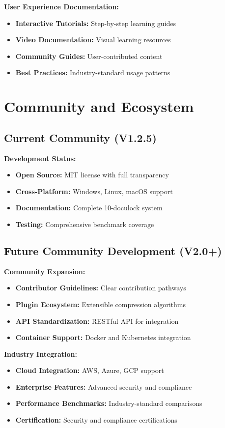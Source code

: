 \documentclass[12pt,a4paper]{article}
\begin{document}
\textbf{User Experience Documentation:}
\begin{itemize}
    \item \textbf{Interactive Tutorials:} Step-by-step learning guides
    \item \textbf{Video Documentation:} Visual learning resources
    \item \textbf{Community Guides:} User-contributed content
    \item \textbf{Best Practices:} Industry-standard usage patterns
\end{itemize}

\section{Community and Ecosystem}

\subsection{Current Community (V1.2.5)}

\textbf{Development Status:}
\begin{itemize}
    \item \textbf{Open Source:} MIT license with full transparency
    \item \textbf{Cross-Platform:} Windows, Linux, macOS support
    \item \textbf{Documentation:} Complete 10-doculock system
    \item \textbf{Testing:} Comprehensive benchmark coverage
\end{itemize}

\subsection{Future Community Development (V2.0+)}

\textbf{Community Expansion:}
\begin{itemize}
    \item \textbf{Contributor Guidelines:} Clear contribution pathways
    \item \textbf{Plugin Ecosystem:} Extensible compression algorithms
    \item \textbf{API Standardization:} RESTful API for integration
    \item \textbf{Container Support:} Docker and Kubernetes integration
\end{itemize}

\textbf{Industry Integration:}
\begin{itemize}
    \item \textbf{Cloud Integration:} AWS, Azure, GCP support
    \item \textbf{Enterprise Features:} Advanced security and compliance
    \item \textbf{Performance Benchmarks:} Industry-standard comparisons
    \item \textbf{Certification:} Security and compliance certifications
\end{itemize}
\end{document}
